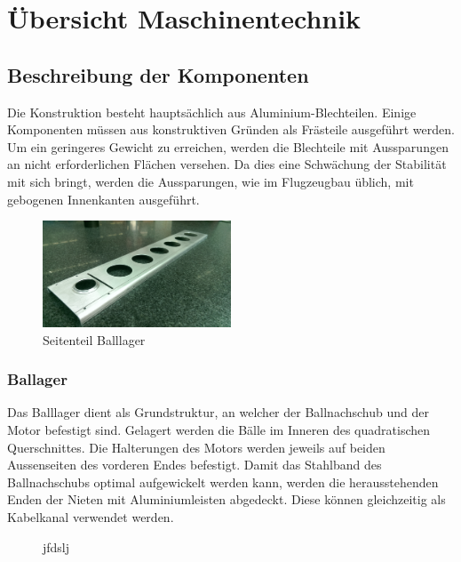 \section{Übersicht Maschinentechnik}

\subsection{Beschreibung der Komponenten}

Die Konstruktion besteht hauptsächlich aus Aluminium-Blechteilen. Einige 
Komponenten müssen aus konstruktiven Gründen als Frästeile ausgeführt werden. 
Um ein geringeres Gewicht zu erreichen, werden die Blechteile mit Aussparungen 
an nicht erforderlichen Flächen versehen. Da dies eine Schwächung der 
Stabilität mit sich bringt, werden die Aussparungen, wie im Flugzeugbau 
üblich, mit gebogenen Innenkanten ausgeführt.

\begin{figure}[h!]          
    \centering             
    \includegraphics[width=0.5\textwidth]{fig/IMAG0364.jpg}
    \caption{Seitenteil Balllager}
    \label{fig:Seitenteil Balllager}        
\end{figure}

\subsubsection{Ballager}
Das Balllager dient als Grundstruktur, an welcher der Ballnachschub und der 
Motor befestigt sind. Gelagert werden die Bälle im Inneren des quadratischen 
Querschnittes. Die Halterungen des Motors werden jeweils auf beiden 
Aussenseiten des vorderen Endes befestigt. Damit das Stahlband des 
Ballnachschubs optimal aufgewickelt werden kann, werden die herausstehenden 
Enden der Nieten mit Aluminiumleisten abgedeckt. Diese können gleichzeitig als 
Kabelkanal verwendet werden. 

\begin{figure}[h!]          
    \centering             
    \caption{jfdslj}
    \label{fig:hhjfdhfd}        
\end{figure}

